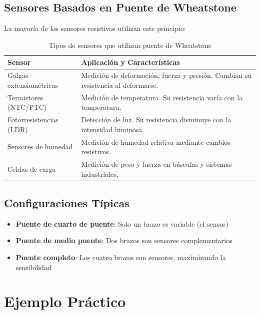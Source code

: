 \documentclass{article}
\begin{document}
\subsection{Sensores Basados en Puente de Wheatstone}
La mayoría de los sensores resistivos utilizan este principio:

\begin{table}[H]
    \centering
    \caption{Tipos de sensores que utilizan puente de Wheatstone}
    \begin{tabular}{p{}p{}}
        \toprule
        \textbf{Sensor} & \textbf{Aplicación y Características} \\
        \midrule
        Galgas extensiométricas & Medición de deformación, fuerza y presión. Cambian su resistencia al deformarse. \\
        \addlinespace
        Termistores (NTC/PTC) & Medición de temperatura. Su resistencia varía con la temperatura. \\
        \addlinespace
        Fotorresistencias (LDR) & Detección de luz. Su resistencia disminuye con la intensidad luminosa. \\
        \addlinespace
        Sensores de humedad & Medición de humedad relativa mediante cambios resistivos. \\
        \addlinespace
        Celdas de carga & Medición de peso y fuerza en básculas y sistemas industriales. \\
        \bottomrule
    \end{tabular}
    \label{tab:sensores}
\end{table}

\subsection{Configuraciones Típicas}
\begin{itemize}
    \item \textbf{Puente de cuarto de puente}: Solo un brazo es variable (el sensor)
    \item \textbf{Puente de medio puente}: Dos brazos son sensores complementarios
    \item \textbf{Puente completo}: Los cuatro brazos son sensores, maximizando la sensibilidad
\end{itemize}

\section{Ejemplo Práctico}
\end{document}
